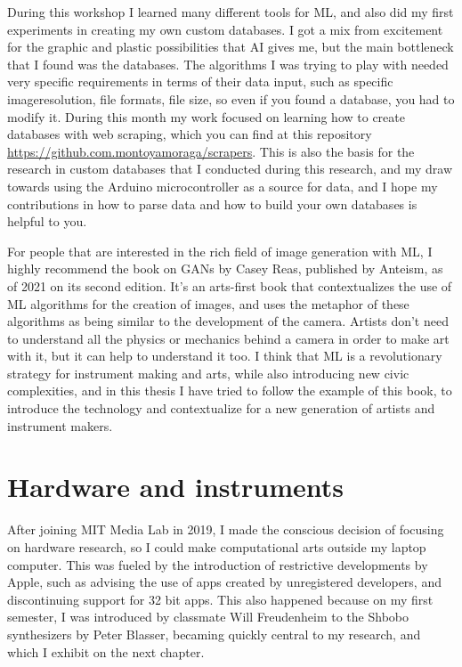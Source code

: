 During this workshop I learned many different tools for \acrshort{ML}, and also did my first experiments in creating my own custom databases. I got a mix from excitement for the graphic and plastic possibilities that \acrshort{AI} gives me, but the main bottleneck that I found was the databases. The algorithms I was trying to play with needed very specific requirements in terms of their data input, such as specific imageresolution, file formats, file size, so even if you found a database, you had to modify it. During this month my work focused on learning how to create databases with web scraping, which you can find at this repository \url{https://github.com.montoyamoraga/scrapers}. This is also the basis for the research in custom databases that I conducted during this research, and my draw towards using the Arduino microcontroller as a source for data, and I hope my contributions in how to parse data and how to build your own databases is helpful to you.

For people that are interested in the rich field of image generation with \acrshort{ML}, I highly recommend the book on GANs by Casey Reas, published by Anteism, as of 2021 on its second edition. It’s an arts-first book that contextualizes the use of \acrshort{ML} algorithms for the creation of images, and uses the metaphor of these algorithms as being similar to the development of the camera. Artists don’t need to understand all the physics or mechanics behind a camera in order to make art with it, but it can help to understand it too. I think that \acrshort{ML} is a revolutionary strategy for instrument making and arts, while also introducing new civic complexities, and in this thesis I have tried to follow the example of this book, to introduce the technology and contextualize for a new generation of artists and instrument makers.

\section{Hardware and instruments}

After joining MIT Media Lab in 2019, I made the conscious decision of focusing on hardware research, so I could make computational arts outside my laptop computer. This was fueled by the introduction of restrictive developments by Apple, such as advising the use of apps created by unregistered developers, and discontinuing support for 32 bit apps. This also happened because on my first semester, I was introduced by classmate Will Freudenheim to the Shbobo synthesizers by Peter Blasser, becaming quickly central to my research, and which I exhibit on the next chapter.


